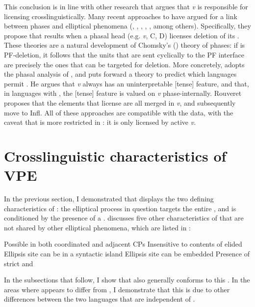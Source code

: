 \documentclass[output=paper]{LSP/langsci}
\begin{document}
This conclusion is in line with other research that argues that \emph{v} is responsible for licensing  crosslinguistically. Many recent approaches to  have argued for a link between phases and elliptical phenomena (\citealt{Holmberg2001}, \citealt{vanCraenenbroeck2004}, \citealt{Gengel2007},  \citealt{YoshidaGallego2008}, \citealt{Gallego2009}, among others). Specifically, they propose that  results when a phasal head (e.g. \emph{v}, C, D) licenses deletion of its . These theories are a natural development of Chomsky's (\citeyear{Chomsky2000,Chomsky2001b,Chomsky2004}) theory of phases: if  is PF-deletion, it follows that the units that are sent cyclically to the PF interface are precisely the ones that can be targeted for deletion. More concretely, \citet{Rouveret2012} adopts the phasal analysis of , and puts forward a theory to predict which languages permit . He argues that \emph{v} always has an uninterpretable [tense] feature, and that, in languages with , the [tense] feature is valued on \emph{v} phase-internally. Rouveret proposes that the elements that license  are all merged in \emph{v}, and subsequently move to Infl. All of these approaches are compatible with the  data, with the caveat that  is more restricted in : it is only licensed by active \emph{v}.


\section{Crosslinguistic characteristics of VPE}\label{sec:johnson:3}

In the previous section, I demonstrated that  displays the two defining characteristics of : the elliptical process in question targets the entire , and is conditioned by the presence of a . \citet{Goldberg2005} discusses five other characteristics of  that are not shared by other elliptical phenomena, which are listed in : 
 
\ea\label{ex:johnson:24}
\ea 
Possible in both coordinated and adjacent CPs
\ex 
Insensitive to contents of elided 
\ex 
Ellipsis site can be in a syntactic island
\ex 
Ellipsis site can be embedded
\ex 
Presence of strict and 
\z
\z


In the subsections that follow, I show that   also generally conforms to this . In the areas where  appears to differ from , I demonstrate that this is due to other differences between the two languages that are independent of .
\end{document}

